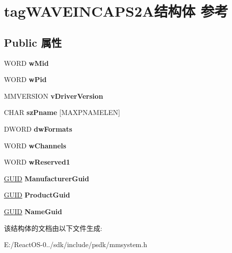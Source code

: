 \hypertarget{structtag_w_a_v_e_i_n_c_a_p_s2_a}{}\section{tag\+W\+A\+V\+E\+I\+N\+C\+A\+P\+S2\+A结构体 参考}
\label{structtag_w_a_v_e_i_n_c_a_p_s2_a}
\subsection*{Public 属性}
\begin{DoxyCompactItemize}
\item 
\mbox{\label{structtag_w_a_v_e_i_n_c_a_p_s2_a_a9d6141957003c0f4ae3494d89753926c}} 
W\+O\+RD {\bfseries w\+Mid}
\item 
\mbox{\label{structtag_w_a_v_e_i_n_c_a_p_s2_a_a8bf818891a11acc2b0a472c068f3f502}} 
W\+O\+RD {\bfseries w\+Pid}
\item 
\mbox{\label{structtag_w_a_v_e_i_n_c_a_p_s2_a_a10d1f25a8a7db730adf291894bdaa047}} 
M\+M\+V\+E\+R\+S\+I\+ON {\bfseries v\+Driver\+Version}
\item 
\mbox{\label{structtag_w_a_v_e_i_n_c_a_p_s2_a_a56b20342c8829376c53917496d78a329}} 
C\+H\+AR {\bfseries sz\+Pname} \mbox{[}M\+A\+X\+P\+N\+A\+M\+E\+L\+EN\mbox{]}
\item 
\mbox{\label{structtag_w_a_v_e_i_n_c_a_p_s2_a_a6d83443bcaaeb0fe4cb3f547c3b98315}} 
D\+W\+O\+RD {\bfseries dw\+Formats}
\item 
\mbox{\label{structtag_w_a_v_e_i_n_c_a_p_s2_a_a71477420ce80e17a1328b943accdc21b}} 
W\+O\+RD {\bfseries w\+Channels}
\item 
\mbox{\label{structtag_w_a_v_e_i_n_c_a_p_s2_a_ae5c7e2d75f2e977547c1bfa89c690026}} 
W\+O\+RD {\bfseries w\+Reserved1}
\item 
\mbox{\label{structtag_w_a_v_e_i_n_c_a_p_s2_a_a50eff75b9d10a9089b637475b7414273}} 
\hyperlink{interface_g_u_i_d}{G\+U\+ID} {\bfseries Manufacturer\+Guid}
\item 
\mbox{\label{structtag_w_a_v_e_i_n_c_a_p_s2_a_a7cbb29c9773ee2ec7eae9707c99733ba}} 
\hyperlink{interface_g_u_i_d}{G\+U\+ID} {\bfseries Product\+Guid}
\item 
\mbox{\label{structtag_w_a_v_e_i_n_c_a_p_s2_a_aa6264479b39c26fcc7b5e8e2001c0103}} 
\hyperlink{interface_g_u_i_d}{G\+U\+ID} {\bfseries Name\+Guid}
\end{DoxyCompactItemize}


该结构体的文档由以下文件生成\+:\begin{DoxyCompactItemize}
\item 
E\+:/\+React\+O\+S-\/0../sdk/include/psdk/mmsystem.\+h\end{DoxyCompactItemize}
